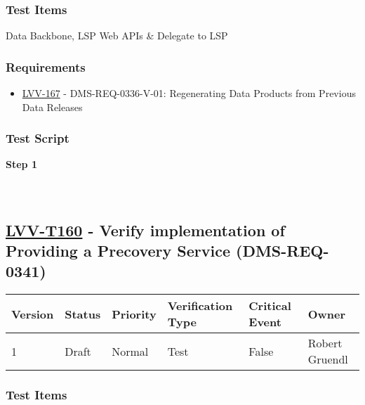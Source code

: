 \hypertarget{test-items-135}{%
\subsubsection{Test Items}\label{test-items-135}}

Data Backbone, LSP Web APIs \& Delegate to LSP

\hypertarget{requirements-136}{%
\subsubsection{Requirements}\label{requirements-136}}

\begin{itemize}
\tightlist
\item
  \href{https://jira.lsstcorp.org/browse/LVV-167}{LVV-167} -
  DMS-REQ-0336-V-01: Regenerating Data Products from Previous Data
  Releases
\end{itemize}

\hypertarget{test-script-136}{%
\subsubsection{Test Script}\label{test-script-136}}

\textbf{Step 1}\\
~\\
~\\

\hypertarget{lvv-t160---verify-implementation-of-providing-a-precovery-service-dms-req-0341}{%
\subsection{\texorpdfstring{\href{https://jira.lsstcorp.org/secure/Tests.jspa\#/testCase/LVV-T160}{LVV-T160}
- Verify implementation of Providing a Precovery Service
(DMS-REQ-0341)}{LVV-T160 - Verify implementation of Providing a Precovery Service (DMS-REQ-0341)}}\label{lvv-t160---verify-implementation-of-providing-a-precovery-service-dms-req-0341}}

\begin{longtable}[]{@{}llllll@{}}
\toprule
Version & Status & Priority & Verification Type & Critical Event &
Owner\tabularnewline
\midrule
\endhead
1 & Draft & Normal & Test & False & Robert Gruendl\tabularnewline
\bottomrule
\end{longtable}

\hypertarget{test-items-136}{%
\subsubsection{Test Items}\label{test-items-136}}

